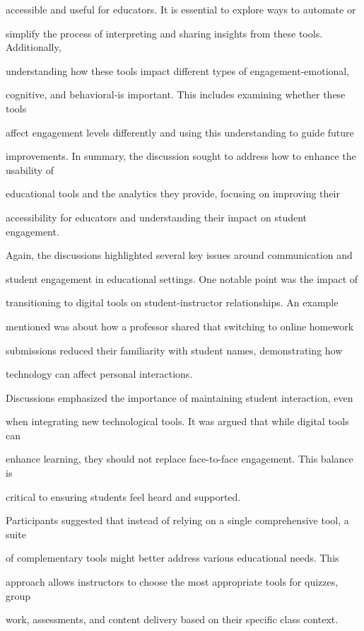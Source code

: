 \documentclass[11pt]{article}
\begin{document}
accessible and useful for educators. It is essential to explore ways to automate or

simplify the process of interpreting and sharing insights from these tools. Additionally,

understanding how these tools impact different types of engagement-emotional,

cognitive, and behavioral-is important. This includes examining whether these tools

affect engagement levels differently and using this understanding to guide future

improvements. In summary, the discussion sought to address how to enhance the usability of

educational tools and the analytics they provide, focusing on improving their

accessibility for educators and understanding their impact on student engagement.

Again, the discussions highlighted several key issues around communication and

student engagement in educational settings. One notable point was the impact of

transitioning to digital tools on student-instructor relationships. An example

mentioned was about how a professor shared that switching to online homework

submissions reduced their familiarity with student names, demonstrating how

technology can affect personal interactions.

Discussions emphasized the importance of maintaining student interaction, even

when integrating new technological tools. It was argued that while digital tools can

enhance learning, they should not replace face-to-face engagement. This balance is

critical to ensuring students feel heard and supported.

Participants suggested that instead of relying on a single comprehensive tool, a suite

of complementary tools might better address various educational needs. This

approach allows instructors to choose the most appropriate tools for quizzes, group

work, assessments, and content delivery based on their specific class context.
\end{document}
